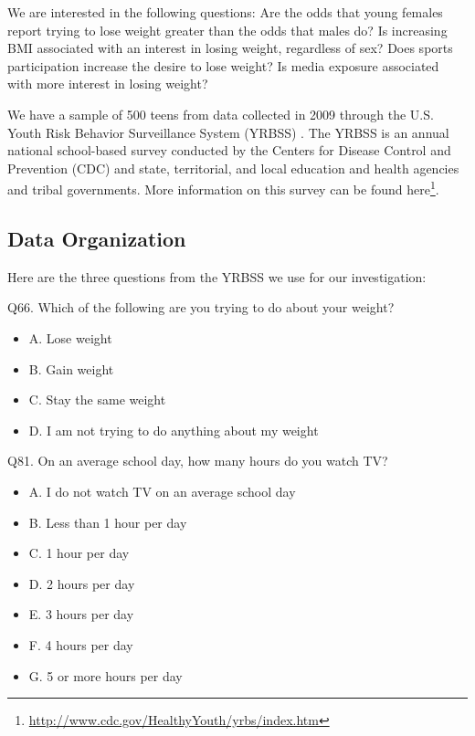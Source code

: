 \documentclass[
]{krantz}
\providecommand{\tightlist}{%
  \setlength{\itemsep}{0pt}\setlength{\parskip}{0pt}}
\renewcommand{\href}[2]{#2\footnote{\url{#1}}}
\begin{document}
We are interested in the following questions: Are the odds that young females report trying to lose weight greater than the odds that males do? Is increasing BMI associated with an interest in losing weight, regardless of sex? Does sports participation increase the desire to lose weight? Is media exposure associated with more interest in losing weight?

We have a sample of 500 teens from data collected in 2009 through the U.S. Youth Risk Behavior Surveillance System (YRBSS) \citep{YRBS2009}. The YRBSS is an annual national school-based survey conducted by the Centers for Disease Control and Prevention (CDC) and state, territorial, and local education and health agencies and tribal governments. More information on this survey can be found \href{http://www.cdc.gov/HealthyYouth/yrbs/index.htm}{here}.

\hypertarget{data-organization-4}{%
\subsection{Data Organization}\label{data-organization-4}}

Here are the three questions from the YRBSS we use for our investigation:

Q66. Which of the following are you trying to do about your weight?

\begin{itemize}
\tightlist
\item
  A. Lose weight
\item
  B. Gain weight
\item
  C. Stay the same weight
\item
  D. I am not trying to do anything about my weight
\end{itemize}

Q81. On an average school day, how many hours do you watch TV?

\begin{itemize}
\tightlist
\item
  A. I do not watch TV on an average school day
\item
  B. Less than 1 hour per day
\item
  C. 1 hour per day
\item
  D. 2 hours per day
\item
  E. 3 hours per day
\item
  F. 4 hours per day
\item
  G. 5 or more hours per day
\end{itemize}
\end{document}
